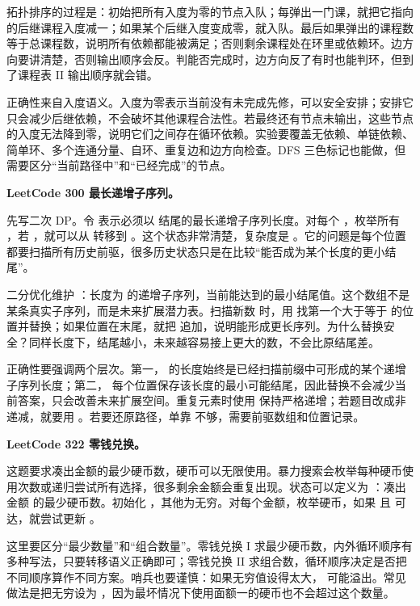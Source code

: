 拓扑排序的过程是：初始把所有入度为零的节点入队；每弹出一门课，就把它指向的后继课程入度减一；如果某个后继入度变成零，就入队。最后如果弹出的课程数等于总课程数，说明所有依赖都能被满足；否则剩余课程处在环里或依赖环。边方向要讲清楚，否则输出顺序会反。判能否完成时，边方向反了有时也能判环，但到了课程表 II 输出顺序就会错。

正确性来自入度语义。入度为零表示当前没有未完成先修，可以安全安排；安排它只会减少后继依赖，不会破坏其他课程合法性。若最终还有节点未输出，这些节点的入度无法降到零，说明它们之间存在循环依赖。实验要覆盖无依赖、单链依赖、简单环、多个连通分量、自环、重复边和边方向检查。DFS 三色标记也能做，但需要区分“当前路径中”和“已经完成”的节点。

\noindent\textbf{LeetCode 300 最长递增子序列。}

先写二次 DP。令  表示必须以  结尾的最长递增子序列长度。对每个 ，枚举所有 ，若 ，就可以从  转移到 。这个状态非常清楚，复杂度是 。它的问题是每个位置都要扫描所有历史前驱，很多历史状态只是在比较“能否成为某个长度的更小结尾”。

二分优化维护 ：长度为  的递增子序列，当前能达到的最小结尾值。这个数组不是某条真实子序列，而是未来扩展潜力表。扫描新数  时，用  找第一个大于等于  的位置并替换；如果位置在末尾，就把  追加，说明能形成更长序列。为什么替换安全？同样长度下，结尾越小，未来越容易接上更大的数，不会比原结尾差。

正确性要强调两个层次。第一， 的长度始终是已经扫描前缀中可形成的某个递增子序列长度；第二， 每个位置保存该长度的最小可能结尾，因此替换不会减少当前答案，只会改善未来扩展空间。重复元素时使用  保持严格递增；若题目改成非递减，就要用 。若要还原路径，单靠  不够，需要前驱数组和位置记录。

\noindent\textbf{LeetCode 322 零钱兑换。}

这题要求凑出金额的最少硬币数，硬币可以无限使用。暴力搜索会枚举每种硬币使用次数或递归尝试所有选择，很多剩余金额会重复出现。状态可以定义为 ：凑出金额  的最少硬币数。初始化 ，其他为无穷。对每个金额，枚举硬币，如果  且  可达，就尝试更新 。

这里要区分“最少数量”和“组合数量”。零钱兑换 I 求最少硬币数，内外循环顺序有多种写法，只要转移语义正确即可；零钱兑换 II 求组合数，循环顺序决定是否把不同顺序算作不同方案。哨兵也要谨慎：如果无穷值设得太大， 可能溢出。常见做法是把无穷设为 ，因为最坏情况下使用面额一的硬币也不会超过这个数量。

